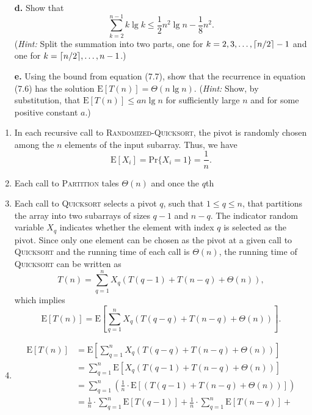 \begin{enumerate}
{\begin{enumerate}
\item[\textbf{d.}]{Show that
\[
  \sum_{k = 2}^{n - 1}{k \lg k} \le \frac{1}{2} n^2 \lg n - \frac{1}{8} n^2.
\]
(\emph{Hint:} Split the summation into two parts, one for
$k = 2, 3, \dots, \lceil n/2\rceil - 1$ and one for $k = \lceil n/2\rceil, \dots, n - 1$.)}

\item[\textbf{e.}]{Using the bound from equation (7.7), show that the recurrence
in equation (7.6) has the solution $\text{E}[T(n)] = \Theta(n \lg n)$.
(\emph{Hint:} Show, by substitution, that $\text{E}[T(n)] \le a n \lg n$ for
sufficiently large $n$ and for some positive constant $a$.)}
\end{enumerate}
}

\begin{framed}
\begin{enumerate}
\item{In each recursive call to \textsc{Randomized-Quicksort}, the pivot is
randomly chosen among the $n$ elements of the input subarray. Thus, we have
\[
  \text{E}[X_i] = \text{Pr}\{X_i = 1\} = \frac{1}{n}.
\]
}
\item{Each call to \textsc{Partition} tales $\Theta(n)$ and once the $q$th }
\item{Each call to \textsc{Quicksort} selects a pivot $q$, such that
$1 \le q \le n$, that partitions the array into two subarrays of sizes $q - 1$
and $n - q$. The indicator random variable $X_q$ indicates whether the element
with index $q$ is selected as the pivot. Since only one element can be chosen as
the pivot at a given call to \textsc{Quicksort} and the running time of each
call is $\Theta(n)$, the running time of \textsc{Quicksort} can be written as
\[
  T(n) = \sum_{q = 1}^{n} X_q ( T(q - 1) + T(n - q) + \Theta(n) ),
\]
which implies
\[
  \text{E}[T(n)] = \text{E}\left[\sum_{q = 1}^{n} X_q (T(q - q) + T(n - q) +
                                                  \Theta(n)) \right].
\]
}
\item{
\begin{equation*}
\begin{aligned}
\text{E}[T(n)]
&= \text{E}\left[\sum_{q = 1}^{n} X_q (T(q - q) + T(n - q) + \Theta(n)) \right]\\
&= \sum_{q = 1}^{n} \text{E}[ X_q (T(q - 1) + T(n - q) + \Theta(n)) ]\\
&= \sum_{q = 1}^{n} \left( \frac{1}{n} \cdot \text{E}[(T(q - 1) + T(n - q) + \Theta(n)) ] \right)\\
&= \frac{1}{n} \cdot \sum_{q = 1}^{n} \text{E}[T(q - 1)] +
   \frac{1}{n} \cdot \sum_{q = 1}^{n} \text{E}[T(n - q)] +

\end{aligned}
\end{equation*}}
\end{enumerate}
\end{framed}
\end{enumerate}

